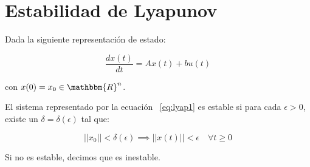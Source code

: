 
\chapter{Estabilidad de Lyapunov}

    Dada la siguiente representación de estado:

    \begin{equation} \label{eq:lyap1}
        \frac{dx(t)}{dt} = A x(t) + b u(t)
    \end{equation}

    con $x(0) = x_0  \in \mathbbm{R}^n$.

    \begin{definicion}
        El sistema representado por la ecuación ~\ref{eq:lyap1} es estable si para cada $\epsilon > 0$, existe un $\delta = \delta(\epsilon)$ tal que:

        \begin{equation*}
            ||x_0|| < \delta(\epsilon) \implies  ||x(t)||  < \epsilon \quad \forall t \ge 0
        \end{equation*}

        Si no es estable, decimos que es inestable.
    \end{definicion}

